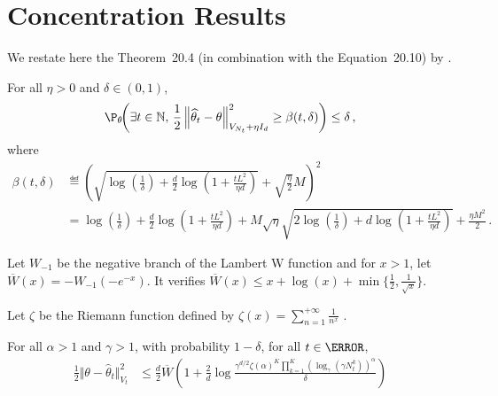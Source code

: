 \section{Concentration Results}\label{app:lgc.concentration}

We restate here the Theorem~20.4 (in combination with the Equation~20.10) by \citet{lattimore2018}.
\begin{theorem}
\label{th:confidence_beta}
For all $\eta >0$ and $\delta\in(0,1)$,
\[
\P_{\theta}\!\!\left(\exists t\in\NN,\, \frac{1}{2}\normm{\htheta_t-\theta}^2_{V_{N_t}+\eta I_d} \geq \beta(t,\delta)\right) \leq \delta\,,
 \]
 where
 \begin{align*}
\beta(t,\delta) &\eqdef  \left( \sqrt{\log\!\left( \frac{1}{\delta}\right)+\frac{d}{2}\log\!\left(1+\frac{t L^2}{\eta d} \right)} +\sqrt{\frac{\eta}{2}}M\right)^2\\
&=\log\!\left( \frac{1}{\delta}\right)+\frac{d}{2}\log\!\left(1+\frac{t L^2}{\eta d} \right) +  M\sqrt{\eta}\sqrt{2\log\!\left( \frac{1}{\delta}\right)+d\log\!\left(1+\frac{t L^2}{\eta d} \right)}+\frac{\eta M^2}{2}\,.
\end{align*}
\end{theorem}


\iffalse
Let $W_{-1}$ be the negative branch of the Lambert W function and for $x>1$, let $\overline{W}(x) = -W_{-1}(-e^{-x})$. It verifies $\overline{W}(x) \le x + \log(x) + \min\{\frac{1}{2}, \frac{1}{\sqrt{x}}\}$.

Let $\zeta$ be the Riemann function defined by $\zeta(x) = \sum_{n=1}^{+\infty}\frac{1}{n^x}$ .

\begin{theorem}\label{thm:maximal_concentration_inequality}
For all $\alpha>1$ and $\gamma>1$, with probability $1-\delta$, for all $t\in \N$,
\begin{align*}
\frac{1}{2} \Vert \theta - \hat{\theta}_t \Vert_{V_t}^2
&\le \frac{d}{2} \overline{W}\left( 1 + \frac{2}{d}\log \frac{\gamma^{d/2}\zeta(\alpha)^K\prod_{k=1}^K(\log_\gamma(\gamma N_t^k))^\alpha}{\delta} \right)
\end{align*}
\end{theorem}


